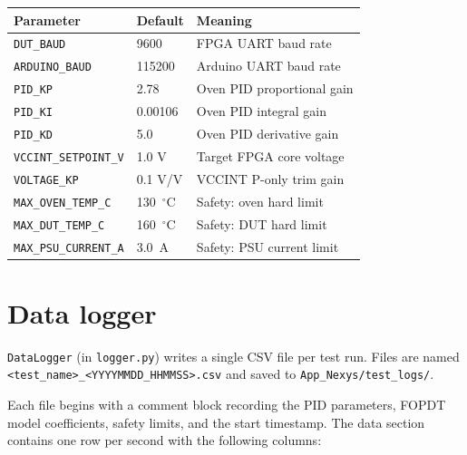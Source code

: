 \documentclass[12pt, a4paper]{report}
\begin{document}
\begin{longtable}{@{}lll@{}}
  \toprule
  \textbf{Parameter} & \textbf{Default} & \textbf{Meaning} \\
  \midrule
  \endhead
  \texttt{DUT\_BAUD}         & 9600          & FPGA UART baud rate \\
  \texttt{ARDUINO\_BAUD}     & 115200        & Arduino UART baud rate \\
  \texttt{PID\_KP}           & 2.78          & Oven PID proportional gain \\
  \texttt{PID\_KI}           & 0.00106       & Oven PID integral gain \\
  \texttt{PID\_KD}           & 5.0           & Oven PID derivative gain \\
  \texttt{VCCINT\_SETPOINT\_V} & 1.0 V       & Target FPGA core voltage \\
  \texttt{VOLTAGE\_KP}       & 0.1 V/V       & VCCINT P-only trim gain \\
  \texttt{MAX\_OVEN\_TEMP\_C} & 130~$^\circ$C & Safety: oven hard limit \\
  \texttt{MAX\_DUT\_TEMP\_C}  & 160~$^\circ$C & Safety: DUT hard limit \\
  \texttt{MAX\_PSU\_CURRENT\_A} & 3.0~A      & Safety: PSU current limit \\
  \bottomrule
\end{longtable}

\section{Data logger}

\texttt{DataLogger} (in \texttt{logger.py}) writes a single CSV file per test run.
Files are named \texttt{<test\_name>\_<YYYYMMDD\_HHMMSS>.csv} and saved to
\texttt{App\_Nexys/test\_logs/}.

Each file begins with a comment block recording the PID parameters, FOPDT model
coefficients, safety limits, and the start timestamp. The data section contains one
row per second with the following columns:
\end{document}
